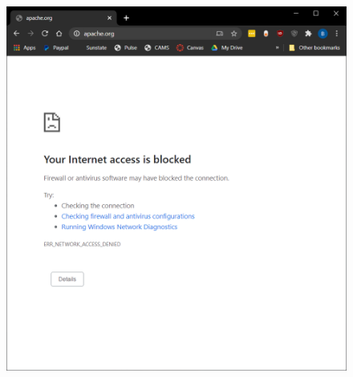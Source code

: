 \begin{enumerate}
\begin{figure}[H]
        \includegraphics[width=\linewidth]{figures/pic12.png}
    \end{figure}
\end{enumerate}